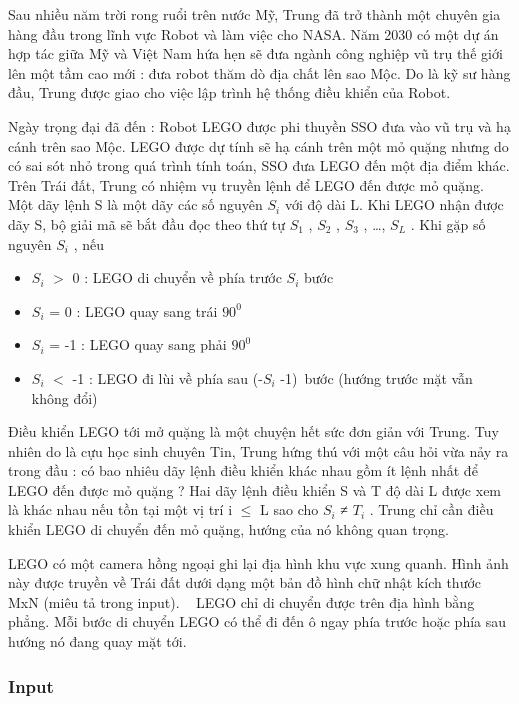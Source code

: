 



\textbf{}   Sau nhiều năm trời rong ruổi trên nước Mỹ, Trung đã trở thành một chuyên gia hàng đầu trong lĩnh vực Robot và làm việc cho NASA. Năm 2030 có một dự án hợp tác giữa Mỹ và Việt Nam hứa hẹn sẽ đưa ngành công nghiệp vũ trụ thế giới lên một tầm cao mới : đưa robot thăm dò địa chất lên sao Mộc. Do là kỹ sư hàng đầu, Trung được giao cho việc lập trình hệ thống điều khiển của Robot.  

   Ngày trọng đại đã đến : Robot LEGO được phi thuyền SSO đưa vào vũ trụ và hạ cánh trên sao Mộc. LEGO được dự tính sẽ hạ cánh trên một mỏ quặng nhưng do có sai sót nhỏ trong quá trình tính toán, SSO đưa LEGO đến một địa điểm khác. Trên Trái đất, Trung có nhiệm vụ truyền lệnh để LEGO đến được mỏ quặng. Một dãy lệnh S là một dãy các số nguyên $S_{i}$   với độ dài L. Khi LEGO nhận được dãy S, bộ giải mã sẽ bắt đầu đọc theo thứ tự $S_{1}$   , $S_{2}$   , $S_{3}$   , …, $S_{L}$   . Khi gặp số nguyên $S_{i}$   , nếu  
\begin{itemize}
	\item     $S_{i}$    $>$ 0 : LEGO di chuyển về phía trước $S_{i}$    bước   
	\item     $S_{i}$    = 0 : LEGO quay sang trái $90^{0}$
	\item     $S_{i}$    = -1 : LEGO quay sang phải $90^{0}$
	\item     $S_{i}$    $<$ -1 : LEGO đi lùi về phía sau (-$S_{i}$    -1) bước (hướng trước mặt vẫn không đổi)   
\end{itemize}

   Điều khiển LEGO tới mở quặng là một chuyện hết sức đơn giản với Trung. Tuy nhiên do là cựu học sinh chuyên Tin, Trung hứng thú với một câu hỏi vừa nảy ra trong đầu : có bao nhiêu dãy lệnh điều khiển khác nhau gồm ít lệnh nhất để LEGO đến được mỏ quặng ? Hai dãy lệnh điều khiển S và T độ dài L được xem là khác nhau nếu tồn tại một vị trí i  $\le$  L sao cho $S_{i}$   ≠ $T_{i}$   . Trung chỉ cần điều khiển LEGO di chuyển đến mỏ quặng, hướng của nó không quan trọng.  

   LEGO có một camera hồng ngoại ghi lại địa hình khu vực xung quanh. Hình ảnh này được truyền về Trái đất dưới dạng một bản đồ hình chữ nhật kích thước MxN (miêu tả trong input).   LEGO chỉ di chuyển được trên địa hình bằng phẳng. Mỗi bước di chuyển LEGO có thể đi đến ô ngay phía trước hoặc phía sau hướng nó đang quay mặt tới.  

\subsubsection{   Input  }

